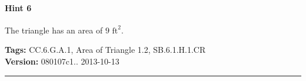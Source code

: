 \documentclass[twocolumn,10pt]{article}
\begin{document}
\paragraph{Hint 6}The triangle has an area of $9\text { ft}^2$.



\medskip
\noindent
\textbf{Tags:} {\footnotesize CC.6.G.A.1, Area of Triangle 1.2, SB.6.1.H.1.CR}\\
\textbf{Version:} 080107c1.. 2013-10-13
\smallskip\hrule



\end{document}
